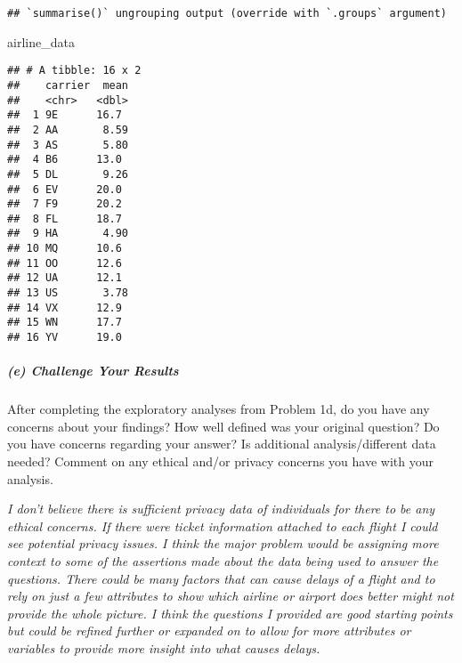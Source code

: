 \documentclass[
]{article}
\newenvironment{Shaded}{\begin{snugshade}}{\end{snugshade}}
\newcommand{\CommentTok}[1]{\textcolor[rgb]{0.56,0.35,0.01}{\textit{#1}}}
\newcommand{\DataTypeTok}[1]{\textcolor[rgb]{0.13,0.29,0.53}{#1}}
\newcommand{\KeywordTok}[1]{\textcolor[rgb]{0.13,0.29,0.53}{\textbf{#1}}}
\newcommand{\NormalTok}[1]{#1}
\newcommand{\OperatorTok}[1]{\textcolor[rgb]{0.81,0.36,0.00}{\textbf{#1}}}
\newcommand{\OtherTok}[1]{\textcolor[rgb]{0.56,0.35,0.01}{#1}}
\newcommand{\StringTok}[1]{\textcolor[rgb]{0.31,0.60,0.02}{#1}}
\begin{document}
\begin{Shaded}
\end{Shaded}

\begin{verbatim}
## `summarise()` ungrouping output (override with `.groups` argument)
\end{verbatim}

\begin{Shaded}
\begin{Highlighting}[]
\NormalTok{airline_data}
\end{Highlighting}
\end{Shaded}

\begin{verbatim}
## # A tibble: 16 x 2
##    carrier  mean
##    <chr>   <dbl>
##  1 9E      16.7 
##  2 AA       8.59
##  3 AS       5.80
##  4 B6      13.0 
##  5 DL       9.26
##  6 EV      20.0 
##  7 F9      20.2 
##  8 FL      18.7 
##  9 HA       4.90
## 10 MQ      10.6 
## 11 OO      12.6 
## 12 UA      12.1 
## 13 US       3.78
## 14 VX      12.9 
## 15 WN      17.7 
## 16 YV      19.0
\end{verbatim}

\hypertarget{e-challenge-your-results}{%
\subparagraph{(e) Challenge Your
Results}\label{e-challenge-your-results}}

After completing the exploratory analyses from Problem 1d, do you have
any concerns about your findings? How well defined was your original
question? Do you have concerns regarding your answer? Is additional
analysis/different data needed? Comment on any ethical and/or privacy
concerns you have with your analysis.

\emph{I don't believe there is sufficient privacy data of individuals
for there to be any ethical concerns. If there were ticket information
attached to each flight I could see potential privacy issues. I think
the major problem would be assigning more context to some of the
assertions made about the data being used to answer the questions. There
could be many factors that can cause delays of a flight and to rely on
just a few attributes to show which airline or airport does better might
not provide the whole picture. I think the questions I provided are good
starting points but could be refined further or expanded on to allow for
more attributes or variables to provide more insight into what causes
delays.}
\end{document}
